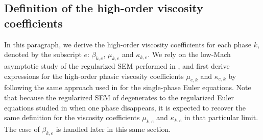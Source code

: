 \documentclass[preprint,10pt]{elsarticle}
\begin{document}
\subsection{Definition of the high-order viscosity coefficients}\label{sec:visc-coeff-ho}
%
In this paragraph, we derive the high-order viscosity coefficients for each phase $k$, denoted by the subscript $e$: $\beta_{k,e}$, $\mu_{k,e}$ and $\kappa_{k,e}$. We rely on the low-Mach asymptotic study of the regularized SEM 
performed in \cite{Marco_paper_sem},
and first derive expressions for the high-order phasic viscosity coefficients $\mu_{e,k}$ and $\kappa_{e,k}$ by following the same 
approach used in \cite{DelchiniCompFluid2014-euler} for the single-phase Euler equations. Note that because the regularized SEM of  
degenerates to the regularized Euler equations studied in \cite{DelchiniCompFluid2014-euler} when one phase disappears, it is expected to recover the same definition for the viscosity coefficients $\mu_{k,e}$ and $\kappa_{k,e}$ in that particular limit. The case of $\beta_{k,e}$ is handled later in this same section. 
\end{document}
